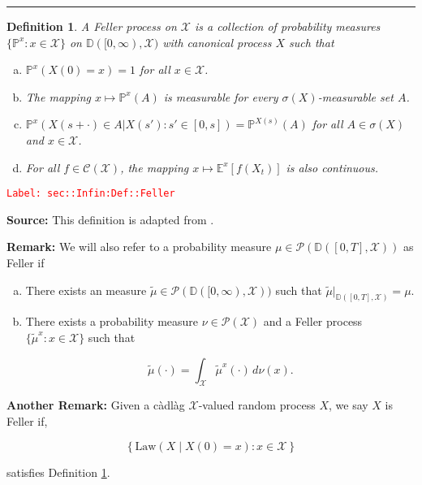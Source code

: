 \documentclass[12pt]{article}
\newcommand{\mb}{\mathbb}
\newcommand{\mc}{\mathcal}
\newcommand{\te}{\text}
\newcommand{\tr}{\textcolor{red}}
\newcommand{\labe}[1]{\tr{\texttt{Label: #1}}}
\newcommand{\lin}{\rule{\linewidth}{0.4 pt}}
\newcommand{\pr}{\mb{P}}							%
\newcommand{\exmu}[2]{\mb{E}^{#1}\left[#2\right]}	%
\newcommand{\cad}{\mb{D}}							%
\newcommand{\T}{T}								%
\newcommand{\x}{x}								%
\renewcommand{\t}{t}							%
\renewcommand{\tt}{s}							%
\newcommand{\ttt}{s'}							%
\newcommand{\X}{X}								%
\newcommand{\f}{f}								%
\newcommand{\tp}[1]{(#1)}						%
\newcommand{\cont}{\mc{C}}						%
\newcommand{\alt}[1]{\widetilde{#1}}			%
\newcommand{\m}{\mu}							%
\newcommand{\mm}{\nu}							%
\newcommand{\law}{\te{Law}}						%
\newcommand{\me}[1]{^{#1}}						%
\newcommand{\typset}{A}							%
\newcommand{\spce}{\mc{X}}						%
\newtheorem{defn}[thms]{Definition}
\begin{document}
\lin

\begin{defn}
A Feller process on \(\spce\) is a collection of probability measures \(\{\pr\me{\x}:\x \in \spce\}\) on \(\cad([0,\infty),\spce)\) with canonical process \(\X\) such that

\begin{enumerate}[(a)]
\item \(\pr\me{\x}(\X\tp{0} = \x) = 1\) for all \(\x \in \spce\).

\item The mapping \(\x \mapsto \pr\me{\x}(\typset)\) is measurable for every \(\sigma(\X)\)-measurable set \(\typset\).

\item \(\pr\me{\x}(\X\tp{\tt+\cdot} \in \typset|\X\tp{\ttt}:\ttt \in [0,\tt]) = \pr\me{\X\tp{\tt}}(\typset)\) for all \(\typset \in \sigma(\X)\) and \(\x \in \spce\).

\item For all \(\f\in \cont(\spce)\), the mapping \(\x\mapsto \exmu{\x}{\f(\X_{\t})}\) is also continuous.
\end{enumerate}
\label{sec::Infin:Def::Feller}
\end{defn}
\labe{sec::Infin:Def::Feller}

\textbf{Source: } This definition is adapted from \cite[Definition 1.1,1.2]{Lig85}.

\textbf{Remark: } We will also refer to a probability measure \(\m \in \mc{P}(\cad([0,\T],\spce))\) as Feller if

\begin{enumerate}[(a)]
\item There exists an measure \(\alt{\m}\in \mc{P}(\cad([0,\infty),\spce))\) such that \(\alt{\m}|_{\cad([0,T],\spce)} = \m\).

\item There exists a probability measure \(\mm\in \mc{P}(\spce)\) and a Feller process \(\{\alt{\m}^\x:\x \in \spce\}\) such that 

\[\alt{\m}(\cdot) = \int_{\spce} \alt{\m}^\x(\cdot)\,d\mm(\x).\]
\end{enumerate}

\textbf{Another Remark: } Given a c\`adl\`ag \(\spce\)-valued random process \(\X\), we say \(\X\) is Feller if,

\[\left\{\law\left(\X\middle|\X\tp{0} = \x\right): \x \in \spce\right\}\]

satisfies Definition \ref{sec::Infin:Def::Feller}.
\end{document}
